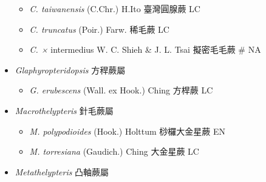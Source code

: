 \begin{itemize}
\begin{itemize}
        \item[] \textit{C. taiwanensis} (C.Chr.) H.Ito  臺灣圓腺蕨   LC
        \item[] \textit{C. truncatus} (Poir.) Farw.  稀毛蕨   LC
        \item[] \textit{C. ×} intermedius \textit{} W. C. Shieh \& J. L. Tsai 
                                        擬密毛毛蕨  \# NA
  \end{itemize}
 \item[] \textit{Glaphyropteridopsis} 方稈蕨屬
                                
  \begin{itemize}
        \item[] \textit{G. erubescens} (Wall. ex Hook.) Ching  方桿蕨   LC
  \end{itemize}
 \item[] \textit{Macrothelypteris} 針毛蕨屬
                                
  \begin{itemize}
        \item[] \textit{M. polypodioides} (Hook.) Holttum  桫欏大金星蕨   EN
        \item[] \textit{M. torresiana} (Gaudich.) Ching  大金星蕨   LC
  \end{itemize}
 \item[] \textit{Metathelypteris} 凸軸蕨屬
                                

\end{itemize}
